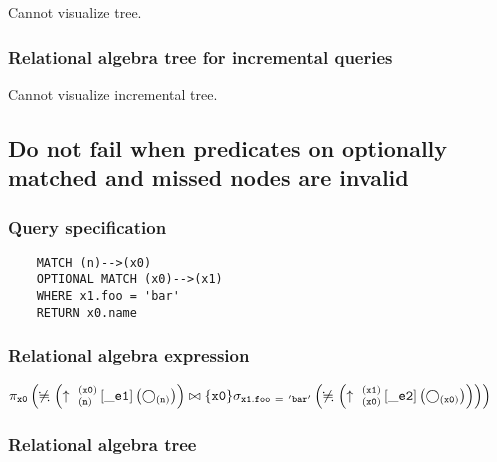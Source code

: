 	Cannot visualize tree.

	\subsubsection*{Relational algebra tree for incremental queries}

	Cannot visualize incremental tree.
	\subsection{Do not fail when predicates on optionally matched and missed nodes are invalid}

	\subsubsection*{Query specification}

	\begin{lstlisting}
	MATCH (n)-->(x0)
	OPTIONAL MATCH (x0)-->(x1)
	WHERE x1.foo = 'bar'
	RETURN x0.name
	\end{lstlisting}


	\subsubsection*{Relational algebra expression}

	$\projection{\var{x0}} \left(\alldifferent{} \left(\expandout{n}{x0}{}{\_e1}{} \left(\getvertices{n}{}\right)\right) \join \{\var{x0}\} \selection{\mathtt{x1.foo~=~'bar'}} \left(\alldifferent{} \left(\expandout{x0}{x1}{}{\_e2}{} \left(\getvertices{x0}{}\right)\right)\right)\right)$

	\subsubsection*{Relational algebra tree}


